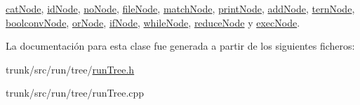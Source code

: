 \hyperlink{classcatNode_af6735016b3cb2477a94de79d7e1e1c62}{cat\-Node}, \hyperlink{classidNode_a720f6ab623192e93743e0098db5d7af7}{id\-Node}, \hyperlink{classnoNode_a20a6dd98d7e65af4ddfaae9fe4abc228}{no\-Node}, \hyperlink{classfileNode_a54a9c6df980993a5de838839f4fc54f3}{file\-Node}, \hyperlink{classmatchNode_a216cb0810f679bab31aa61eeaad86f9a}{match\-Node}, \hyperlink{classprintNode_a5a3da53743a7d8be8641672478eaad4c}{print\-Node}, \hyperlink{classaddNode_aade4eeee8fc992cc3322ee7f608ce5d2}{add\-Node}, \hyperlink{classternNode_a5ba4c96a74db8179e190d2ae60958be4}{tern\-Node}, \hyperlink{classboolconvNode_a344001e8903f5969a0187021d749c637}{boolconv\-Node}, \hyperlink{classorNode_a326d03128c3fd68b03749eb6d9c31ec3}{or\-Node}, \hyperlink{classifNode_af136e318ac35eaab32770bebe8c039a1}{if\-Node}, \hyperlink{classwhileNode_ac46ec596fcf2cc2a4ec397de4bcdfef4}{while\-Node}, \hyperlink{classreduceNode_aab13f70c0ca5a00dec30f9ea1be93420}{reduce\-Node} y \hyperlink{classexecNode_a0eec036e65db650fa5a58e92dfbfb967}{exec\-Node}.



La documentación para esta clase fue generada a partir de los siguientes ficheros\-:\begin{DoxyCompactItemize}
\item 
trunk/src/run/tree/\hyperlink{runTree_8h}{run\-Tree.\-h}\item 
trunk/src/run/tree/run\-Tree.\-cpp\end{DoxyCompactItemize}
